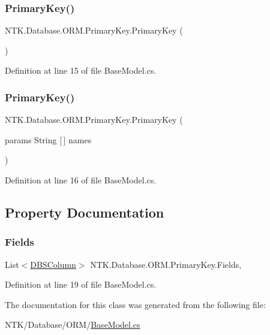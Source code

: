 \subsubsection{\texorpdfstring{PrimaryKey()}{PrimaryKey()}\hspace{0.1cm}{\footnotesize\ttfamily [1/2]}}
{\footnotesize\ttfamily N\+T\+K.\+Database.\+O\+R\+M.\+Primary\+Key.\+Primary\+Key (\begin{DoxyParamCaption}{ }\end{DoxyParamCaption})}



Definition at line 15 of file Base\+Model.\+cs.

\mbox{\label{class_n_t_k_1_1_database_1_1_o_r_m_1_1_primary_key_a0df4cc8e60a24ffee002a8bcb135ee05}} 
\subsubsection{\texorpdfstring{PrimaryKey()}{PrimaryKey()}\hspace{0.1cm}{\footnotesize\ttfamily [2/2]}}
{\footnotesize\ttfamily N\+T\+K.\+Database.\+O\+R\+M.\+Primary\+Key.\+Primary\+Key (\begin{DoxyParamCaption}\item[{params String \mbox{[}$\,$\mbox{]}}]{names }\end{DoxyParamCaption})}



Definition at line 16 of file Base\+Model.\+cs.



\subsection{Property Documentation}
\mbox{\label{class_n_t_k_1_1_database_1_1_o_r_m_1_1_primary_key_a0b37031f75b71dd7dabfb0343a946a8f}} 
\subsubsection{\texorpdfstring{Fields}{Fields}}
{\footnotesize\ttfamily List$<$\mbox{\hyperlink{class_n_t_k_1_1_database_1_1_d_b_s_column}{D\+B\+S\+Column}}$>$ N\+T\+K.\+Database.\+O\+R\+M.\+Primary\+Key.\+Fields\hspace{0.3cm}{\ttfamily [get]}, {\ttfamily [set]}}



Definition at line 19 of file Base\+Model.\+cs.



The documentation for this class was generated from the following file\+:\begin{DoxyCompactItemize}
\item 
N\+T\+K/\+Database/\+O\+R\+M/\mbox{\hyperlink{_base_model_8cs}{Base\+Model.\+cs}}\end{DoxyCompactItemize}
